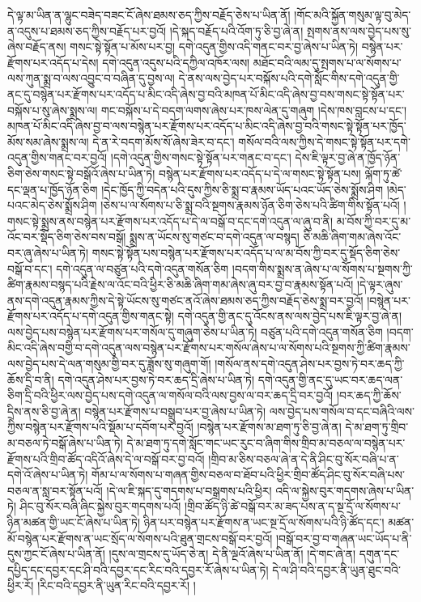 དེ་ལྟ་མ་ཡིན་ན་ལྷུང་བཟེད་བཟང་ངོ་ཞེས་ཐམས་ཅད་ཀྱིས་བརྗོད་ཅེས་པ་ཡིན་ནོ། །གོང་མའི་སྐྱོན་གསུམ་ལྟ་བུ་མེད་ན་འདུས་པ་ཐམས་ཅད་ཀྱིས་བརྗོད་པར་བྱའོ། །དེ་སྐད་བརྗོད་པའི་འོག་ཏུ་ཅི་བྱ་ཞེ་ན། སྤགས་ནས་ལས་བྱེད་པས་སུ་ཞེས་བརྗོད་ནས། གསང་སྟེ་སྟོན་པ་མོས་པར་བྱ། དགེ་འདུན་གྱིས་འདི་གནང་བར་བྱ་ཞེས་པ་ཡིན་ཏེ། བསྙེན་པར་རྫོགས་པར་འདོད་པ་དེས། དགེ་འདུན་འདུས་པའི་དཀྱིལ་འཁོར་ལས། མཐོང་བའི་ལམ་དུ་སྤགས་པ་ལ་སོགས་པ་ལས་ཀུན་སྨྲ་བ་ལས་འབྱུང་བ་བཞིན་དུ་བྱས་ལ། དེ་ནས་ལས་བྱེད་པར་བསྐོས་པའི་དགེ་སློང་གིས་དགེ་འདུན་གྱི་ནང་དུ་བསྙེན་པར་རྫོགས་པར་འདོད་པ་མིང་འདི་ཞེས་བྱ་བའི་མཁན་པོ་མིང་འདི་ཞེས་བྱ་བས་གསང་སྟེ་སྟོན་པར་བསྐོས་པ་སུ་ཞེས་སྨྲས་ལ། གང་བསྐོས་པ་དེ་བདག་ལགས་ཞེས་པར་ཁས་ལེན་དུ་གཞུག །དེས་ཁས་བླངས་པ་དང་། མཁན་པོ་མིང་འདི་ཞེས་བྱ་བ་ལས་བསྙེན་པར་རྫོགས་པར་འདོད་པ་མིང་འདི་ཞེས་བྱ་བའི་གསང་སྟེ་སྟོན་པར་ཁྱོད་མོས་སམ་ཞེས་སྨྲས་ལ། དེ་ན་རེ་བདག་མོས་སོ་ཞེས་ཟེར་བ་དང་། གསོལ་བའི་ལས་ཀྱིས་དེ་གསང་སྟེ་སྟོན་པར་དགེ་འདུན་གྱིས་གནང་བར་བྱའོ། །དགེ་འདུན་གྱིས་གསང་སྟེ་སྟོན་པར་གནང་བ་དང་། དེས་ཇི་ལྟར་བྱ་ཞེ་ན་ཁྱོད་ཉོན་ཅིག་ཅེས་གསང་སྟེ་བསྒོའོ་ཞེས་པ་ཡིན་ཏེ། བསྙེན་པར་རྫོགས་པར་འདོད་པ་དེ་ལ་གསང་སྟེ་སྟོན་པས། ལྐོག་ཏུ་ཚེ་དང་ལྡན་པ་ཁྱོད་ཉོན་ཅིག །དེང་ཁྱོད་ཀྱི་བདེན་པའི་དུས་ཀྱིས་ཅི་སྨྲ་བ་རྣམས་ཡོད་པའང་ཡོད་ཅེས་སྨྲོས་ཤིག །མེད་པའང་མེད་ཅེས་སྨྲོས་ཤིག །ཅེས་པ་ལ་སོགས་པ་ཅི་སྨྲ་བའི་སྔགས་རྣམས་ཉོན་ཅིག་ཅེས་པའི་ཚིག་གིས་སྟོན་པའོ། །གསང་སྟེ་སྨྲས་ནས་བསྙེན་པར་རྫོགས་པར་འདོད་པ་དེ་ལ་བསྒོ་བ་དང་དགེ་འདུན་ལ་ཞུ་བ་ནི། མ་བོས་ཀྱི་བར་དུ་མ་འོང་བར་སྡོད་ཅིག་ཅེས་བས་བསྒོ། སྨྲས་ན་ཡོངས་སུ་གཙང་བ་དགེ་འདུན་ལ་བསྙད། ཅི་མཆི་ཞིག་གམ་ཞེས་འོང་བར་ཞུ་ཞེས་པ་ཡིན་ཏེ། གསང་སྟེ་སྟོན་པས་བསྙེན་པར་རྫོགས་པར་འདོད་པ་ལ་མ་བོས་ཀྱི་བར་དུ་སྡོད་ཅིག་ཅེས་བསྒོ་བ་དང་། དགེ་འདུན་ལ་བཙུན་པའི་དགེ་འདུན་གསོན་ཅིག །བདག་གིས་སྨྲས་ན་ཞེས་པ་ལ་སོགས་པ་སྔགས་ཀྱི་ཚིག་རྣམས་བསྙད་པའི་རྗེས་ལ་འོང་བའི་ཕྱིར་ཅི་མཆི་ཞིག་གམ་ཞེས་ཞུ་བར་བྱ་བ་རྣམས་སྟོན་པའོ། །དེ་ལྟར་ཞུས་ནས་དགེ་འདུན་རྣམས་ཀྱིས་དེ་སྟེ་ཡོངས་སུ་གཙང་ནའོ་ཞེས་ཐམས་ཅད་ཀྱིས་བརྗོད་ཅེས་སྨྲ་བར་བྱའོ། །བསྙེན་པར་རྫོགས་པར་འདོད་པ་དགེ་འདུན་གྱིས་གནང་སྟེ། དགེ་འདུན་གྱི་ནང་དུ་འོངས་ནས་ལས་བྱེད་པས་ཇི་ལྟར་བྱ་ཞེ་ན། ལས་བྱེད་པས་བསྙེན་པར་རྫོགས་པར་གསོལ་དུ་གཞུག་ཅེས་པ་ཡིན་ཏེ། བཙུན་པའི་དགེ་འདུན་གསོན་ཅིག །བདག་མིང་འདི་ཞེས་བགྱི་བ་དགེ་འདུན་ལས་བསྙེན་པར་རྫོགས་པར་གསོལ་ཞེས་པ་ལ་སོགས་པའི་སྔགས་ཀྱི་ཚིག་རྣམས་ལས་བྱེད་པས་དེ་ལན་གསུམ་གྱི་བར་དུ་ཟློས་སུ་གཞུག་གོ། །གསོལ་ནས་དགེ་འདུན་ཤེས་པར་བྱས་ཏེ་བར་ཆད་ཀྱི་ཆོས་དྲི་བ་ནི། དགེ་འདུན་ཤེས་པར་བྱས་ཏེ་བར་ཆད་དྲི་ཞེས་པ་ཡིན་ཏེ། དགེ་འདུན་གྱི་ནང་དུ་ཡང་བར་ཆད་ལན་ཅིག་དྲི་བའི་ཕྱིར་ལས་བྱེད་པས་དགེ་འདུན་ལ་གསོལ་བའི་ལས་བྱས་ལ་བར་ཆད་དྲི་བར་བྱའོ། །བར་ཆད་ཀྱི་ཆོས་དྲིས་ནས་ཅི་བྱ་ཞེ་ན། བསྙེན་པར་རྫོགས་པ་བསྒྲུབ་པར་བྱ་ཞེས་པ་ཡིན་ཏེ། ལས་བྱེད་པས་གསོལ་བ་དང་བཞིའི་ལས་ཀྱིས་བསྙེན་པར་རྫོགས་པའི་སྡོམ་པ་དབོག་པར་བྱའོ། །བསྙེན་པར་རྫོགས་མ་ཐག་ཏུ་ཅི་བྱ་ཞེ་ན། དེ་མ་ཐག་ཏུ་གྲིབ་མ་བཅལ་ཏེ་བསྒོ་ཞེས་པ་ཡིན་ཏེ། དེ་མ་ཐག་ཏུ་དགེ་སློང་གང་ཡང་རུང་བ་ཞིག་གིས་གྲིབ་མ་བཅལ་ལ་བསྙེན་པར་རྫོགས་པའི་གྲིབ་ཚོད་འདིའོ་ཞེས་དེ་ལ་བསྒོ་བར་བྱ་བའོ། །གྲིབ་མ་ཅིས་བཅལ་ཞེ་ན་དེ་ནི་ཤིང་བུ་སོར་བཞི་པ་ན་དགེ་འོ་ཞེས་པ་ཡིན་ཏེ། གོམ་པ་ལ་སོགས་པ་གཞན་གྱིས་བཅལ་བ་ཐོབ་པའི་ཕྱིར་གྲིབ་ཚོད་ཤིང་བུ་སོར་བཞི་པས་བཅལ་ན་སླ་བར་སྟོན་པའོ། །དེ་ལ་ཇི་སྐད་དུ་གདགས་པ་བསྒྲགས་པའི་ཕྱིར། འདི་ལ་སྐྱེས་བུར་གདགས་ཞེས་པ་ཡིན་ཏེ། ཤིང་བུ་སོར་བཞི་ཞིང་སྐྱེས་བུར་གདགས་པའོ། །གྲིབ་ཚོད་ཉི་ཚེ་བསྒོ་བར་མ་ཟད་པས་ན་ད་སྔ་དྲོ་ལ་སོགས་པ་ཉིན་མཚན་གྱི་ཡང་ངོ་ཞེས་པ་ཡིན་ཏེ། ཉིན་པར་བསྙེན་པར་རྫོགས་ན་ཡང་སྔ་དྲོ་ལ་སོགས་པའི་ཉི་ཚོད་དང་། མཚན་མོ་བསྙེན་པར་རྫོགས་ན་ཡང་སྲོད་ལ་སོགས་པའི་ཐུན་གྲངས་བསྒོ་བར་བྱའོ། །བསྒོ་བར་བྱ་བ་གཞན་ཡང་ཡོད་པ་ནི་དུས་ཀྱང་ངོ་ཞེས་པ་ཡིན་ནོ། །དུས་ལ་གྲངས་དུ་ཡོད་ཅེ་ན། དེ་ནི་ལྔའོ་ཞེས་པ་ཡིན་ནོ། །དེ་གང་ཞེ་ན། དགུན་དང་དཔྱིད་དང་དབྱར་དང་ཤི་བའི་དབྱར་དང་རིང་བའི་དབྱར་རོ་ཞེས་པ་ཡིན་ཏེ། དེ་ལ་ཤི་བའི་དབྱར་ནི་ཡུན་ཐུང་བའི་ཕྱིར་རོ། །རིང་བའི་དབྱར་ནི་ཡུན་རིང་བའི་དབྱར་རོ། །
